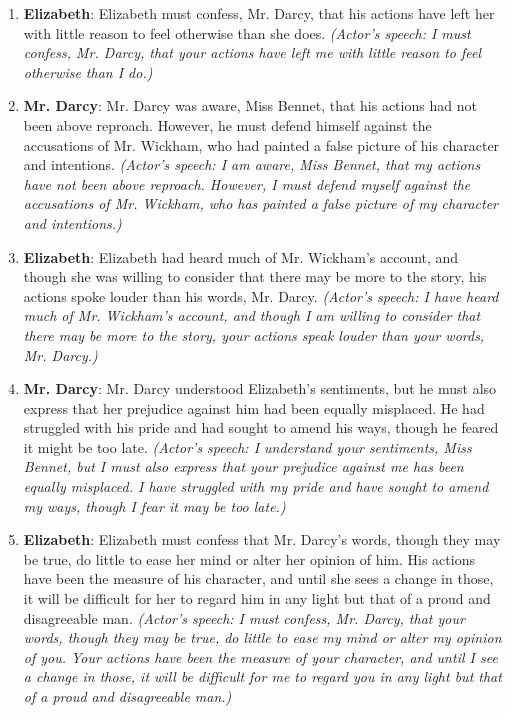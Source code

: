 \documentclass[10pt]{article}
\begin{document}
\begin{enumerate}\setlength{\itemsep}{1pt}\small

\item \textbf{Elizabeth}: Elizabeth must confess, Mr. Darcy, that his actions have left her with little reason to feel otherwise than she does. \emph{(Actor's speech: I must confess, Mr. Darcy, that your actions have left me with little reason to feel otherwise than I do.)}

\item \textbf{Mr. Darcy}: Mr. Darcy was aware, Miss Bennet, that his actions had not been above reproach. However, he must defend himself against the accusations of Mr. Wickham, who had painted a false picture of his character and intentions. \emph{(Actor's speech: I am aware, Miss Bennet, that my actions have not been above reproach. However, I must defend myself against the accusations of Mr. Wickham, who has painted a false picture of my character and intentions.)}

\item \textbf{Elizabeth}: Elizabeth had heard much of Mr. Wickham's account, and though she was willing to consider that there may be more to the story, his actions spoke louder than his words, Mr. Darcy. \emph{(Actor's speech: I have heard much of Mr. Wickham's account, and though I am willing to consider that there may be more to the story, your actions speak louder than your words, Mr. Darcy.)}

\item \textbf{Mr. Darcy}: Mr. Darcy understood Elizabeth's sentiments, but he must also express that her prejudice against him had been equally misplaced. He had struggled with his pride and had sought to amend his ways, though he feared it might be too late. \emph{(Actor's speech: I understand your sentiments, Miss Bennet, but I must also express that your prejudice against me has been equally misplaced. I have struggled with my pride and have sought to amend my ways, though I fear it may be too late.)}

\item \textbf{Elizabeth}: Elizabeth must confess that Mr. Darcy's words, though they may be true, do little to ease her mind or alter her opinion of him. His actions have been the measure of his character, and until she sees a change in those, it will be difficult for her to regard him in any light but that of a proud and disagreeable man. \emph{(Actor's speech: I must confess, Mr. Darcy, that your words, though they may be true, do little to ease my mind or alter my opinion of you. Your actions have been the measure of your character, and until I see a change in those, it will be difficult for me to regard you in any light but that of a proud and disagreeable man.)}


\end{enumerate}
\end{document}
